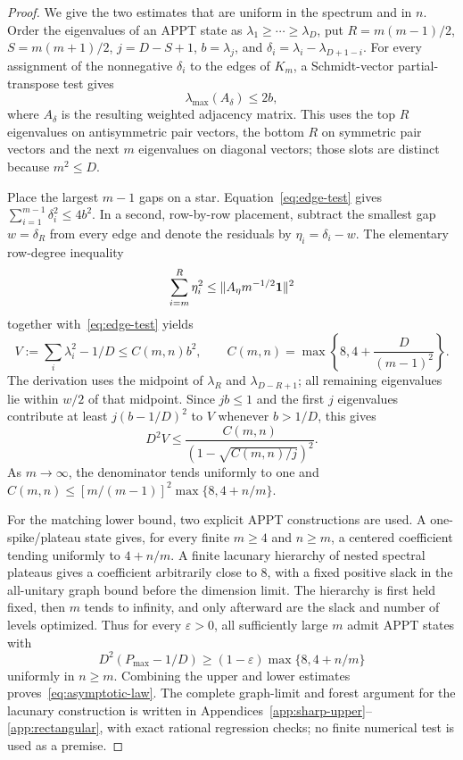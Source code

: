 \documentclass[11pt]{article}
\theoremstyle{remark}\newtheorem{remark}[theorem]{Remark}
\begin{document}
\begin{proof}
We give the two estimates that are uniform in the spectrum and in $n$. Order the eigenvalues of an APPT state as $\lambda_1\geq\cdots\geq\lambda_D$, put $R=m(m-1)/2$, $S=m(m+1)/2$, $j=D-S+1$, $b=\lambda_j$, and $\delta_i=\lambda_i-\lambda_{D+1-i}$. For every assignment of the nonnegative $\delta_i$ to the edges of $K_m$, a Schmidt-vector partial-transpose test gives
\begin{equation}\label{eq:edge-test}
 \lambda_{\max}(A_\delta)\leq2b,
\end{equation}
where $A_\delta$ is the resulting weighted adjacency matrix. This uses the top $R$ eigenvalues on antisymmetric pair vectors, the bottom $R$ on symmetric pair vectors and the next $m$ eigenvalues on diagonal vectors; those slots are distinct because $m^2\leq D$.

Place the largest $m-1$ gaps on a star. Equation~\eqref{eq:edge-test} gives $\sum_{i=1}^{m-1}\delta_i^2\leq4b^2$. In a second, row-by-row placement, subtract the smallest gap $w=\delta_R$ from every edge and denote the residuals by $\eta_i=\delta_i-w$. The elementary row-degree inequality
\[
 \sum_{i=m}^R\eta_i^2\leq\|A_\eta m^{-1/2}{\bf1}\|^2
\]
together with~\eqref{eq:edge-test} yields
\[
 V:=\sum_i\lambda_i^2-1/D\leq C(m,n)b^2,
 \qquad C(m,n)=\max\left\{8,4+\frac{D}{(m-1)^2}\right\}.
\]
The derivation uses the midpoint of $\lambda_R$ and $\lambda_{D-R+1}$; all remaining eigenvalues lie within $w/2$ of that midpoint. Since $jb\leq1$ and the first $j$ eigenvalues contribute at least $j(b-1/D)^2$ to $V$ whenever $b>1/D$, this gives
\[
 D^2V\leq\frac{C(m,n)}{(1-\sqrt{C(m,n)/j})^2}.
\]
As $m\to\infty$, the denominator tends uniformly to one and $C(m,n)\leq[m/(m-1)]^2\max\{8,4+n/m\}$.

For the matching lower bound, two explicit APPT constructions are used. A one-spike/plateau state gives, for every finite $m\geq4$ and $n\geq m$, a centered coefficient tending uniformly to $4+n/m$. A finite lacunary hierarchy of nested spectral plateaus gives a coefficient arbitrarily close to $8$, with a fixed positive slack in the all-unitary graph bound before the dimension limit. The hierarchy is first held fixed, then $m$ tends to infinity, and only afterward are the slack and number of levels optimized. Thus for every $\varepsilon>0$, all sufficiently large $m$ admit APPT states with
\[
 D^2(P_{\max}-1/D)\geq(1-\varepsilon)\max\{8,4+n/m\}
\]
uniformly in $n\geq m$. Combining the upper and lower estimates proves~\eqref{eq:asymptotic-law}. The complete graph-limit and forest argument for the lacunary construction is written in Appendices~\ref{app:sharp-upper}--\ref{app:rectangular}, with exact rational regression checks; no finite numerical test is used as a premise.
\end{proof}
\end{document}

